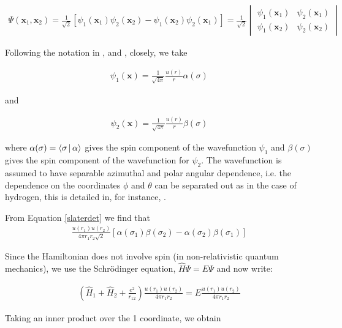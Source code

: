 \documentclass[11pt,letterpaper]{article}
\begin{document}
\begin{align}
\Psi(\mathbf{x}_1,\mathbf{x}_2) = 
\frac{1}{\sqrt{2}}[\psi_1(\mathbf{x}_1)\psi_2(\mathbf{x}_2) - 
                   \psi_1(\mathbf{x}_2)\psi_2(\mathbf{x}_1)] = 
\frac{1}{\sqrt{2}}
\begin{vmatrix} 
\psi_1(\mathbf{x}_1) & \psi_2(\mathbf{x}_1) \\ 
\psi_1(\mathbf{x}_2) & \psi_2(\mathbf{x}_2) 
\end{vmatrix}
\label{slaterdet}
\end{align}

Following the notation in \cite[p.~152]{griffiths05}, \cite{david06} and
\cite[p.~68]{koonin90}, closely, we take

\begin{align}
\psi_1(\mathbf{x}) = 
\frac{1}{\sqrt{4\pi}}
\frac{u(r)}{r}
\alpha(\sigma)
\end{align}

and

\begin{align}
\psi_2(\mathbf{x}) = 
\frac{1}{\sqrt{4\pi}}
\frac{u(r)}{r}
\beta(\sigma)
\end{align}


where $\alpha(\sigma) = \Braket{\sigma | \alpha}$ gives the spin component 
of the wavefunction $\psi_1$ and
$\beta(\sigma)$ gives the spin component of the wavefunction for
$\psi_2$. The wavefunction is assumed to have separable
azimuthal and polar angular dependence, i.e. the dependence on the coordinates
$\phi$ and $\theta$ can be separated out as in the case of hydrogen, this
is detailed in, for instance, \cite{griffiths05}.



From Equation \eqref{slaterdet} we find that
\begin{align}
\frac{u(r_1)u(r_2)}{4\pi r_1r_2\sqrt{2}}
\left[\alpha(\sigma_1)\beta(\sigma_2)-\alpha(\sigma_2)\beta(\sigma_1)\right]
\end{align}

Since the Hamiltonian does not involve spin (in non-relativistic
quantum mechanics), we use the Schr\"{o}dinger equation,
$\hat{H}\Psi = E\Psi$
and now write:

\begin{align}
\left(\hat{H}_1 + \hat{H}_2 + \frac{e^2}{r_{12}}\right)
\frac{u(r_1)u(r_2)}{4\pi r_1r_2} =
E \frac{u(r_1)u(r_2)}{4\pi r_1r_2} 
\end{align}


Taking an inner product over the 1 coordinate, we obtain
\end{document}
